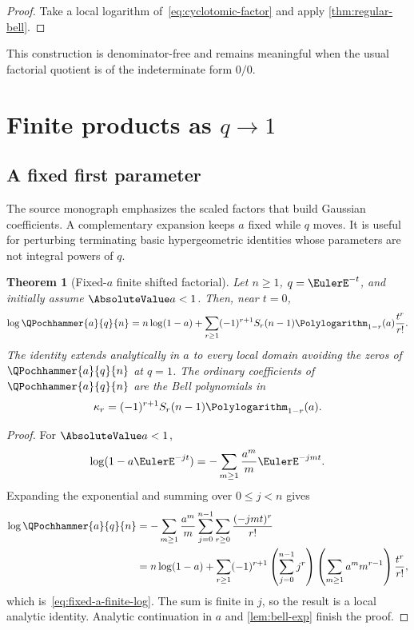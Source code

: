 \documentclass[11pt,oneside]{article}
\newtheorem{theorem}{Theorem}[section]
\theoremstyle{definition}
\theoremstyle{remark}
\let\reporttopsection\section
\let\reportsubsection\subsection
\let\chapter\reporttopsection
\let\section\reportsubsection
\begin{document}
\begin{proof}
Take a local logarithm of~\eqref{eq:cyclotomic-factor} and apply
\cref{thm:regular-bell}.
\end{proof}

This construction is denominator-free and remains meaningful when the usual
factorial quotient is of the indeterminate form $0/0$.

\chapter{Finite products as \texorpdfstring{$q\to1$}{q tends to 1}}\label{chap:qone-finite}

\section{A fixed first parameter}

The source monograph emphasizes the scaled factors that build Gaussian
coefficients.  A complementary expansion keeps $a$ fixed while $q$ moves.  It
is useful for perturbing terminating basic hypergeometric identities whose
parameters are not integral powers of $q$.

\begin{theorem}[Fixed-$a$ finite shifted factorial]\label{thm:fixed-a-finite}
Let $n\ge1$, $q=\EulerE^{-t}$, and initially assume $\AbsoluteValue a<1$.  Then, near $t=0$,
\begin{equation}\label{eq:fixed-a-finite-log}
 \log\QPochhammer{a}{q}{n}
 =n\log(1-a)+
 \sum_{r\ge1}(-1)^{r+1}S_r(n-1)\Polylogarithm_{1-r}(a)\frac{t^r}{r!}.
\end{equation}
The identity extends analytically in $a$ to every local domain avoiding the
zeros of $\QPochhammer{a}{q}{n}$ at $q=1$.  The ordinary coefficients of $\QPochhammer{a}{q}{n}$ are
the Bell polynomials in
\[
 \kappa_r=(-1)^{r+1}S_r(n-1)\Polylogarithm_{1-r}(a).
\]
\end{theorem}

\begin{proof}
For $\AbsoluteValue a<1$,
\[
 \log(1-a\EulerE^{-jt})
 =-\sum_{m\ge1}\frac{a^m}{m}\EulerE^{-jmt}.
\]
Expanding the exponential and summing over $0\le j<n$ gives
\begin{align*}
 \log\QPochhammer{a}{q}{n}
 &=-\sum_{m\ge1}\frac{a^m}{m}
   \sum_{j=0}^{n-1}\sum_{r\ge0}\frac{(-jmt)^r}{r!}\\
 &=n\log(1-a)+
   \sum_{r\ge1}(-1)^{r+1}
   \left(\sum_{j=0}^{n-1}j^r\right)
   \left(\sum_{m\ge1}a^m m^{r-1}\right)\frac{t^r}{r!},
\end{align*}
which is~\eqref{eq:fixed-a-finite-log}.  The sum is finite in $j$, so the
result is a local analytic identity.  Analytic continuation in $a$ and
\cref{lem:bell-exp} finish the proof.
\end{proof}
\end{document}
